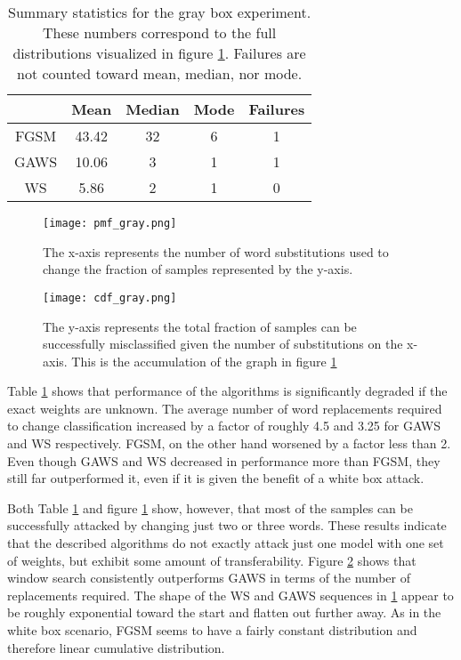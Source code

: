 \begin{table}
\centering
\begin{tabular}{ |c|c|c|c|c| } \hline
& Mean & Median & Mode & Failures\\ \hline
FGSM & 43.42 & 32 & 6 & 1\\ \hline
GAWS & 10.06 & 3 & 1 & 1\\ \hline
WS & 5.86 & 2 & 1 & 0\\ \hline
\end{tabular}
\caption{Summary statistics for the gray box experiment.  These numbers correspond to the full distributions visualized in figure \ref{fig:graypmf}.  Failures are not counted toward mean, median, nor mode.}
\label{tab:graysum}
\end{table}
\begin{figure}
    \centering
    \texttt{[image: pmf\_gray.png]}
    \caption{The x-axis represents the number of word substitutions used to change the fraction of samples represented by the y-axis.}
    \label{fig:graypmf}
\end{figure}

\begin{figure}
    \centering
    \texttt{[image: cdf\_gray.png]}
    \caption{The y-axis represents the total fraction of samples can be successfully misclassified given the number of substitutions on the x-axis.  This is the accumulation of the graph in figure \ref{fig:graypmf}}
    \label{fig:graycdf}
\end{figure}

Table \ref{tab:graysum} shows that performance of the algorithms is significantly degraded if the exact weights are unknown.  The average number of word replacements required to change classification increased by a factor of roughly 4.5 and 3.25 for GAWS and WS respectively.  FGSM, on the other hand worsened by a factor less than 2.  Even though GAWS and WS decreased in performance more than FGSM, they still far outperformed it, even if it is given the benefit of a white box attack.

Both Table \ref{tab:graysum} and figure \ref{fig:graypmf} show, however, that most of the samples can be successfully attacked by changing just two or three words.  These results indicate that the described algorithms do not exactly attack just one model with one set of weights, but exhibit some amount of transferability.  Figure \ref{fig:graycdf} shows that window search consistently outperforms GAWS in terms of the number of replacements required.  The shape of the WS and GAWS sequences in \ref{fig:graypmf} appear to be roughly exponential toward the start and flatten out further away.  As in the white box scenario, FGSM seems to have a fairly constant distribution and therefore linear cumulative distribution.

